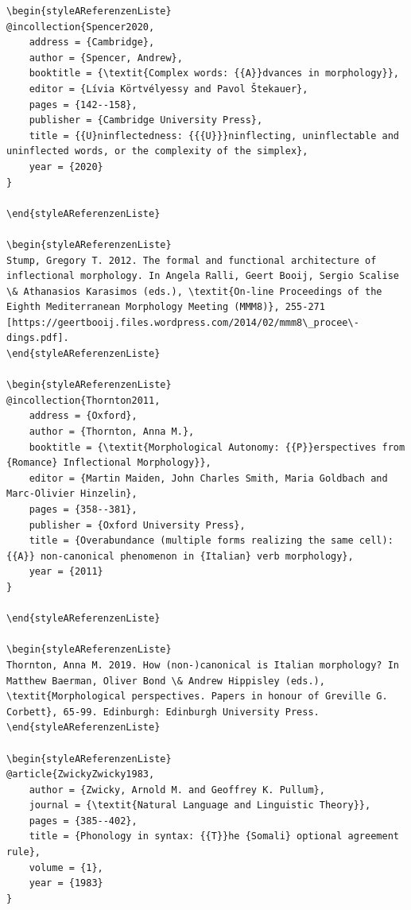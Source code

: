 \documentclass[output=paper]{langscibook}
\begin{document}
\begin{styleBiblio}
\begin{verbatim}
\begin{styleAReferenzenListe}
@incollection{Spencer2020,
	address = {Cambridge},
	author = {Spencer, Andrew},
	booktitle = {\textit{Complex words: {{A}}dvances in morphology}},
	editor = {Lívia Körtvélyessy and Pavol Štekauer},
	pages = {142--158},
	publisher = {Cambridge University Press},
	title = {{U}ninflectedness: {{{U}}}ninflecting, uninflectable and uninflected words, or the complexity of the simplex},
	year = {2020}
}

\end{styleAReferenzenListe}

\begin{styleAReferenzenListe}
Stump, Gregory T. 2012. The formal and functional architecture of inflectional morphology. In Angela Ralli, Geert Booij, Sergio Scalise \& Athanasios Karasimos (eds.), \textit{On-line Proceedings of the Eighth Mediterranean Morphology Meeting (MMM8)}, 255-271 [https://geertbooij.files.wordpress.com/2014/02/mmm8\_procee\-dings.pdf].
\end{styleAReferenzenListe}

\begin{styleAReferenzenListe}
@incollection{Thornton2011,
	address = {Oxford},
	author = {Thornton, Anna M.},
	booktitle = {\textit{Morphological Autonomy: {{P}}erspectives from {Romance} Inflectional Morphology}},
	editor = {Martin Maiden, John Charles Smith, Maria Goldbach and Marc-Olivier Hinzelin},
	pages = {358--381},
	publisher = {Oxford University Press},
	title = {Overabundance (multiple forms realizing the same cell): {{A}} non-canonical phenomenon in {Italian} verb morphology},
	year = {2011}
}

\end{styleAReferenzenListe}

\begin{styleAReferenzenListe}
Thornton, Anna M. 2019. How (non-)canonical is Italian morphology? In Matthew Baerman, Oliver Bond \& Andrew Hippisley (eds.), \textit{Morphological perspectives. Papers in honour of Greville G. Corbett}, 65-99. Edinburgh: Edinburgh University Press.
\end{styleAReferenzenListe}

\begin{styleAReferenzenListe}
@article{ZwickyZwicky1983,
	author = {Zwicky, Arnold M. and Geoffrey K. Pullum},
	journal = {\textit{Natural Language and Linguistic Theory}},
	pages = {385--402},
	title = {Phonology in syntax: {{T}}he {Somali} optional agreement rule},
	volume = {1},
	year = {1983}
}


\end{verbatim}
\end{styleBiblio}
\end{document}
